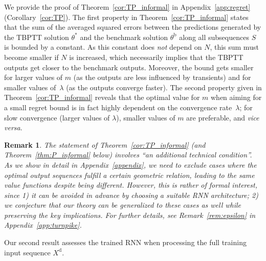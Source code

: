 \documentclass{article} %
\newtheorem{rem}{Remark}
\begin{document}
We provide the proof of Theorem~\ref{cor:TP_informal} in Appendix~\ref{app:regret} (Corollary~\ref{cor:TP}).
The first property in Theorem~\ref{cor:TP_informal} states that the sum of the averaged squared errors between the predictions generated by the TBPTT solution $\theta^*$ and the benchmark solution $\theta^\mathrm{b}$ along all subsequences $S$ is bounded by a constant.
As this constant does \emph{not} depend on $N$, this sum must become smaller if $N$ is increased, which necessarily implies that the TBPTT outputs get closer to the benchmark outputs. Moreover, the bound gets smaller for larger values of $m$ (as the outputs are less influenced by transients) and for smaller values of~$\lambda$ (as the outputs converge faster).
The second property given in Theorem~\ref{cor:TP_informal} reveals that the optimal value for $m$ when aiming for a small regret bound is in fact highly dependent on the convergence rate~$\lambda$; for slow convergence (larger values of $\lambda$), smaller values of $m$ are preferable, and \textit{vice versa}.

\begin{rem}
	The statement of Theorem~\ref{cor:TP_informal} (and Theorem~\ref{thm:P_informal} below) involves ``an additional technical condition''. As we show in detail in Appendix~\ref{appendix}, we need to exclude cases where the optimal output sequences fulfill a certain geometric relation, leading to the same value functions despite being different. However, this is rather of formal interest, since 1) it can be avoided in advance by choosing a suitable RNN architecture; 2) we conjecture that our theory can be generalized to these cases as well while preserving the key implications. For further details, see Remark~\ref{rem:epsilon} in Appendix~\ref{app:turnpike}.
\end{rem}

Our second result assesses the trained RNN when processing the full training input sequence $X^\mathrm{d}$.
\end{document}
